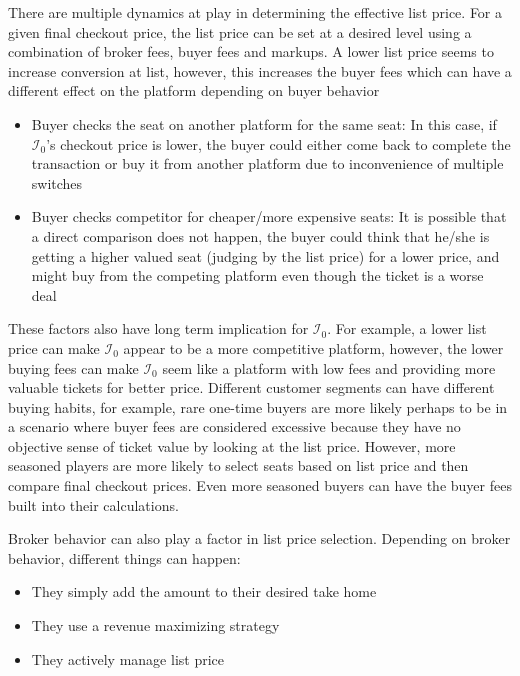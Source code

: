 \documentclass[letterpaper, 12pt]{article}
\begin{document}
 There are multiple dynamics at play in determining the effective list price. For a given final checkout price, the list price can be set at a desired level using a combination of broker fees, buyer fees and markups. A lower list price seems to increase conversion at list, however, this increases the buyer fees which can have a different effect on the platform depending on buyer behavior
	\begin{itemize}\itemsep0em
		\item Buyer checks the seat on another platform for the same seat: In this case, if $\mathcal{I}_0$'s checkout price is lower, the buyer could either come back to complete the transaction or buy it from another platform due to inconvenience of multiple switches
		\item Buyer checks competitor for cheaper/more expensive seats: It is possible that a direct comparison does not happen, the buyer could think that he/she is getting a higher valued seat (judging by the list price) for a lower price, and might buy from the competing platform even though the ticket is a worse deal
	\end{itemize}
	These factors also have long term implication for $\mathcal{I}_0$. For example, a lower list price can make $\mathcal{I}_0$ appear to be a more competitive platform, however, the lower buying fees can make $\mathcal{I}_0$ seem like a platform with low fees and providing more valuable tickets for better price. Different customer segments can have different buying habits, for example, rare one-time buyers are more likely perhaps to be in a scenario where buyer fees are considered excessive because they have no objective sense of ticket value by looking at the list price. However, more seasoned players are more likely to select seats based on list price and then compare final checkout prices. Even more seasoned buyers can have the buyer fees built into their calculations. 

	Broker behavior can also play a factor in list price selection. Depending on broker behavior, different things can happen:
	\begin{itemize}\itemsep0em
		\item They simply add the amount to their desired take home
		\item They use a revenue maximizing strategy
		\item They actively manage list price
	\end{itemize}
\end{document}
